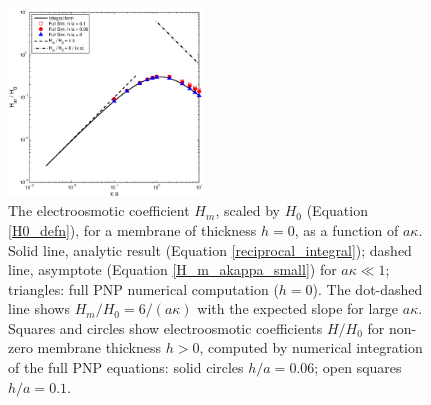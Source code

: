 \begin{figure}[H]
\begin{center}
\includegraphics[width=0.46\textwidth]{finite_thickness/HmOverH0LogLog3}
\end{center}
\caption{The electroosmotic coefficient $H_{m}$, scaled by $H_0$ (Equation \ref{H0_defn}), for a membrane of thickness $h=0$, as a function of $a\kappa$. Solid line, analytic result (Equation \ref{reciprocal_integral}); dashed line, asymptote (Equation \ref{H_m_akappa_small}) for $a\kappa\ll 1$;
triangles: full PNP numerical computation ($h=0$). The dot-dashed line shows $H_{m}/H_0=6/(a\kappa)$ with the expected slope for large $a\kappa$. Squares and circles show electroosmotic coefficients $H/H_0$ for non-zero membrane thickness $h>0$, computed by numerical integration of the full PNP equations: solid circles  $h/a=0.06$; open squares $h/a=0.1$.}
\label{Fig:H_m_log_log}
\end{figure}

